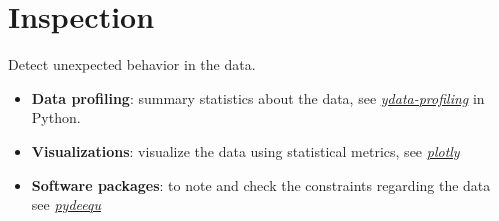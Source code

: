 \section{Inspection} 
Detect unexpected behavior in the data.
\begin{itemize}
    \item \textbf{Data profiling}: summary statistics about the data, see \href{https://github.com/ydataai/ydata-profiling}{\textit{ydata-profiling}} in Python.
    \item \textbf{Visualizations}: visualize the data using statistical metrics, see
        \href{https://plotly.com/python/}{\textit{plotly}}
    \item \textbf{Software packages}: to note and check the constraints regarding the data
        see \href{https://pypi.org/project/pydeequ/}{\textit{pydeequ}}
\end{itemize}

